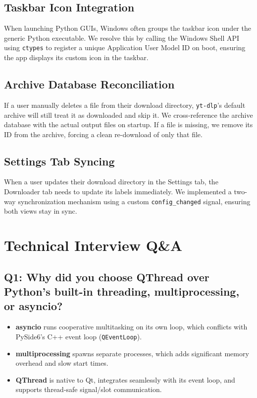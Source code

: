 \documentclass[12pt]{report}
\begin{document}
\section{Taskbar Icon Integration}
When launching Python GUIs, Windows often groups the taskbar icon under the generic Python executable. We resolve this by calling the Windows Shell API using \texttt{ctypes} to register a unique Application User Model ID on boot, ensuring the app displays its custom icon in the taskbar.

\section{Archive Database Reconciliation}
If a user manually deletes a file from their download directory, \texttt{yt-dlp}'s default archive will still treat it as downloaded and skip it. We cross-reference the archive database with the actual output files on startup. If a file is missing, we remove its ID from the archive, forcing a clean re-download of only that file.

\section{Settings Tab Syncing}
When a user updates their download directory in the Settings tab, the Downloader tab needs to update its labels immediately. We implemented a two-way synchronization mechanism using a custom \texttt{config\_changed} signal, ensuring both views stay in sync.

\newpage
\chapter{Technical Interview Q\&A}

\section[Question 1]{Q1: Why did you choose QThread over Python's built-in threading, multiprocessing, or asyncio?}
\begin{itemize}[leftmargin=*]
    \item \textbf{asyncio} runs cooperative multitasking on its own loop, which conflicts with PySide6's C++ event loop (\texttt{QEventLoop}).
    \item \textbf{multiprocessing} spawns separate processes, which adds significant memory overhead and slow start times.
    \item \textbf{QThread} is native to Qt, integrates seamlessly with its event loop, and supports thread-safe signal/slot communication.
\end{itemize}
\end{document}
